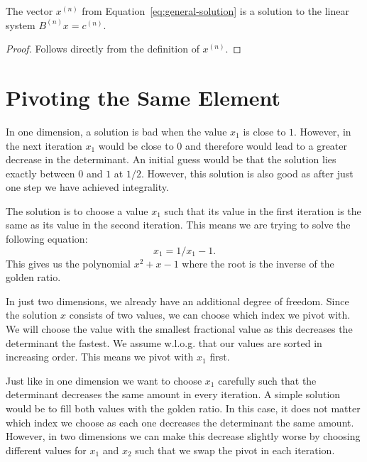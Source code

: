 \documentclass[english,version-2020-11]{uzl-thesis}
\begin{document}
\begin{lemma}
  The vector $x^{(n)}$ from Equation~\ref{eq:general-solution} is a solution to the
  linear system $B^{(n)} x = c^{(n)}$.
\end{lemma}

\begin{proof}
  Follows directly from the definition of $x^{(n)}$.
\end{proof}

\section{Pivoting the Same Element}

In one dimension, a solution is bad when the value $x_1$ is close to $1$.
However, in the next iteration $x_1$ would be close to $0$ and therefore
would lead to a greater decrease in the determinant.
An initial guess would be that the solution lies exactly between $0$ and $1$ at $1/2$.
However, this solution is also good as after just one step we have achieved integrality.

The solution is to choose a value $x_1$ such that its value in the first
iteration is the same as its value in the second iteration.
This means we are trying to solve the following equation:
\[
  x_1 = 1/x_1 - 1.
\]
This gives us the polynomial $x^2 + x - 1$ where the root is the inverse of the
golden ratio.

In just two dimensions, we already have an additional degree of freedom.
Since the solution $x$ consists of two values, we can choose which index we pivot with.
We will choose the value with the smallest fractional value as this decreases
the determinant the fastest.
We assume w.l.o.g. that our values are sorted in increasing order.
This means we pivot with $x_1$ first.

Just like in one dimension we want to choose $x_1$ carefully such that the
determinant decreases the same amount in every iteration.
A simple solution would be to fill both values with the golden ratio.
In this case, it does not matter which index we choose as each one decreases
the determinant the same amount.
However, in two dimensions we can make this decrease slightly worse
by choosing different values for $x_1$ and $x_2$ such that we swap the pivot
in each iteration.
\end{document}
